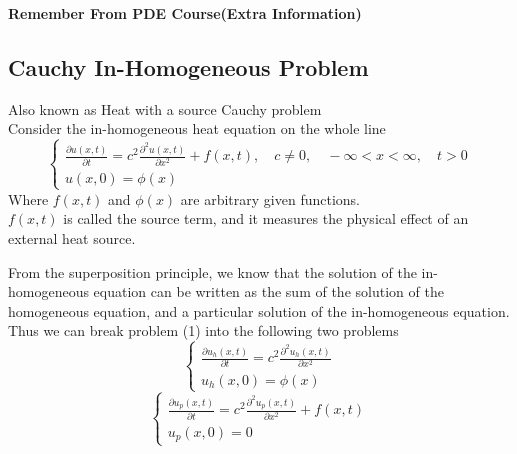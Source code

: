 \documentclass[]{article}
\begin{document}
\setcounter{equation}{0}
\begin{enrichment*}{}
        \begin{center}
                \textbf{Remember From PDE Course(Extra Information)}
        \end{center}
    \end{enrichment*}


\subsection{Cauchy In-Homogeneous Problem}
Also known as Heat with a source Cauchy problem
\\
Consider the in-homogeneous heat equation on the whole line
\begin{equation}
    \begin{cases}
        \displaystyle \frac{\partial u\left(x,t \right)}{\partial t} = c^2 \frac{\partial^2 u(x,t)}{\partial x^2} + f(x,t),\quad c\neq 0,\quad-\infty<x<\infty,\quad t>0
        \\
        u\left(x,0 \right) = \phi\left(x\right)
    \end{cases}
\end{equation}
Where $f(x, t)$ and $\phi(x)$ are arbitrary given functions. 
\\$f(x, t)$ is called the source term, and it measures the physical effect of an external heat source.
\par
From the superposition principle, we know that the solution of the in-homogeneous equation can
be written as the sum of the solution of the homogeneous equation, and a particular solution of the
in-homogeneous equation. 
\\
Thus we can break problem (1) into the following two problems
\begin{equation}
    \begin{cases}
        \displaystyle \frac{\partial u_h\left(x,t \right)}{\partial t} = c^2 \frac{\partial^2 u_h(x,t)}{\partial x^2}
        \\
        u_h\left(x,0 \right) = \phi\left(x\right)
    \end{cases}
\end{equation}
\begin{equation}
    \begin{cases}
        \displaystyle \frac{\partial u_p\left(x,t \right)}{\partial t} = c^2 \frac{\partial^2 u_p(x,t)}{\partial x^2}+ f(x,t)
        \\
        u_p\left(x,0 \right) = 0
    \end{cases}
\end{equation}
\end{document}
